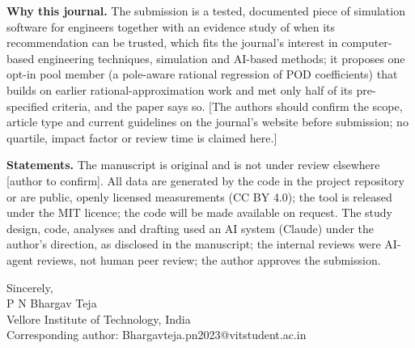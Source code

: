 \documentclass[11pt]{article}
\begin{document}
\textbf{Why this journal.} The submission is a tested, documented piece of simulation software for engineers together with an evidence study of when its recommendation can be trusted, which fits the journal's interest in computer-based engineering techniques, simulation and AI-based methods; it proposes one opt-in pool member (a pole-aware rational regression of POD coefficients) that builds on earlier rational-approximation work and met only half of its pre-specified criteria, and the paper says so. [The authors should confirm the scope, article type and current guidelines on the journal's website before submission; no quartile, impact factor or review time is claimed here.]

\textbf{Statements.} The manuscript is original and is not under review elsewhere [author to confirm]. All data are generated by the code in the project repository or are public, openly licensed measurements (CC BY 4.0); the tool is released under the MIT licence; the code will be made available on request. The study design, code, analyses and drafting used an AI system (Claude) under the author's direction, as disclosed in the manuscript; the internal reviews were AI-agent reviews, not human peer review; the author approves the submission.

Sincerely,\\\relax
P N Bhargav Teja\\Vellore Institute of Technology, India\\Corresponding author: Bhargavteja.pn2023@vitstudent.ac.in
\end{document}
